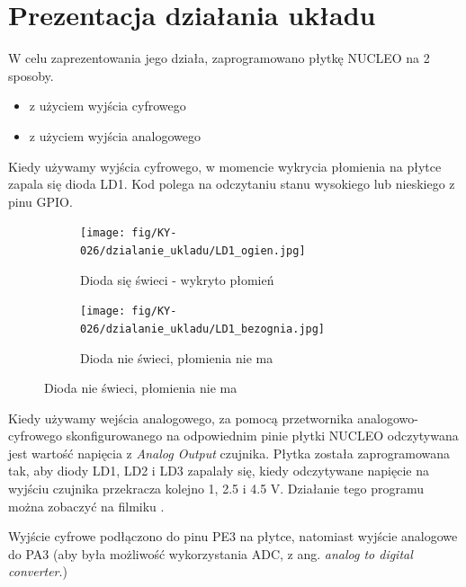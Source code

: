 \documentclass[11pt, a4paper]{article}
\begin{document}
\newpage

\section{Prezentacja działania układu}
W celu zaprezentowania jego działa, zaprogramowano płytkę NUCLEO na 2 sposoby. 
\begin{itemize}
    \item z użyciem wyjścia cyfrowego
    \item z użyciem wyjścia analogowego
\end{itemize}

Kiedy używamy wyjścia cyfrowego, w momencie wykrycia płomienia na płytce zapala się dioda LD1. Kod polega na odczytaniu stanu wysokiego lub nieskiego z pinu GPIO.

\begin{figure}[h]
\centering
\begin{subfigure}{.4\textwidth}
  \centering
  \texttt{[image: fig/KY-026/dzialanie\_ukladu/LD1\_ogien.jpg]}
  \caption{Dioda się świeci - wykryto płomień}
  \label{fig:12pd}
\end{subfigure}
\begin{subfigure}{.4\textwidth}
  \centering
  \texttt{[image: fig/KY-026/dzialanie\_ukladu/LD1\_bezognia.jpg]}
  \caption{Dioda nie świeci, płomienia nie ma}
  \label{fig:sub2}
\end{subfigure}
\label{fig:12pu}
\end{figure}

Kiedy używamy wejścia analogowego, za pomocą przetwornika analogowo-cyfrowego skonfigurowanego na odpowiednim pinie płytki NUCLEO odczytywana jest wartość napięcia z \textit{Analog Output} czujnika. Płytka została zaprogramowana tak, aby diody LD1, LD2 i LD3 zapalały się, kiedy odczytywane napięcie na wyjściu czujnika przekracza kolejno 1, 2.5 i 4.5 V. Działanie tego programu można zobaczyć na filmiku \cite{a2}. 

Wyjście cyfrowe podłączono do pinu PE3 na płytce, natomiast wyjście analogowe do PA3 (aby była możliwość wykorzystania ADC, z ang. \textit{analog to digital converter}.)


\printbibliography[heading=bibintoc]
\end{document}
